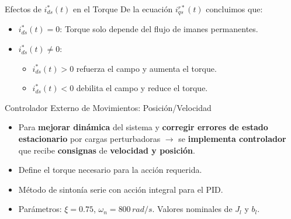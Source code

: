 \documentclass[12pt]{beamer}
\begin{document}
\begin{frame}{Efectos de $i_{ds}^*(t)$ en el Torque}
De la ecuación \textbf{$i_{qs}^{r*}(t)$} concluimos que:
    \begin{itemize}
        \item $i_{ds}^*(t) = 0$: Torque solo depende del flujo de imanes permanentes.
        \item $i_{ds}^*(t) \neq 0$:
        \begin{itemize}
            \item $i_{ds}^*(t) > 0$ refuerza el campo y aumenta el torque.
            \item $i_{ds}^*(t) < 0$ debilita el campo y reduce el torque.
        \end{itemize}
    \end{itemize}
\end{frame}


\begin{frame}{Controlador Externo de Movimientos: Posición/Velocidad}
    \begin{itemize}
        \item Para \textbf{mejorar dinámica} del sistema y \textbf{corregir errores de estado estacionario} por cargas perturbadoras \textbf{$\rightarrow$} se \textbf{implementa controlador} que recibe \textbf{consignas} de \textbf{velocidad y posición}.
        \item Define el torque necesario para la acción requerida.
        \item Método de sintonía serie con acción integral para el PID.
        \item Parámetros: $\xi = 0.75$, $\omega_n = 800\, {rad/s}$. Valores nominales de $J_l$ y $b_l$.
    \end{itemize}
\end{frame}
\end{document}
